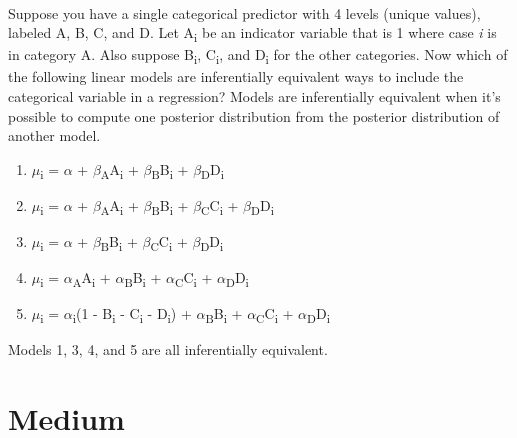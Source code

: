 \documentclass[12pt]{article}\usepackage[]{graphicx}\usepackage[]{color}
\newenvironment{problem}[2][Problem]{\begin{trivlist}
\item[\hskip \labelsep {\bfseries #1}\hskip \labelsep {\bfseries #2.}]}{\end{trivlist}}
\begin{document}
\begin{problem}{5E4}
\text{ }\\
Suppose you have a single categorical predictor with 4 levels (unique values), labeled A, B, C, and D. Let A\textsubscript{i} be an indicator variable that is 1 where case \textit{i} is in category A. Also suppose B\textsubscript{i}, C\textsubscript{i}, and D\textsubscript{i} for the other categories. Now which of the following linear models are inferentially equivalent ways to include the categorical variable in a regression? Models are inferentially equivalent when it's possible to compute one posterior distribution from the posterior distribution of another model.
\begin{enumerate}
	\item $\mu$\textsubscript{i} = $\alpha$ + $\beta$\textsubscript{A}A\textsubscript{i} + $\beta$\textsubscript{B}B\textsubscript{i} + $\beta$\textsubscript{D}D\textsubscript{i}
	\item $\mu$\textsubscript{i} = $\alpha$ + $\beta$\textsubscript{A}A\textsubscript{i} + $\beta$\textsubscript{B}B\textsubscript{i} + $\beta$\textsubscript{C}C\textsubscript{i} + $\beta$\textsubscript{D}D\textsubscript{i}
	\item $\mu$\textsubscript{i} = $\alpha$ + $\beta$\textsubscript{B}B\textsubscript{i} + $\beta$\textsubscript{C}C\textsubscript{i} + $\beta$\textsubscript{D}D\textsubscript{i}
	\item $\mu$\textsubscript{i} = $\alpha$\textsubscript{A}A\textsubscript{i} + $\alpha$\textsubscript{B}B\textsubscript{i} + $\alpha$\textsubscript{C}C\textsubscript{i} + $\alpha$\textsubscript{D}D\textsubscript{i}
	\item $\mu$\textsubscript{i} = $\alpha$\textsubscript{i}(1 - B\textsubscript{i} - C\textsubscript{i} - D\textsubscript{i}) + $\alpha$\textsubscript{B}B\textsubscript{i} + $\alpha$\textsubscript{C}C\textsubscript{i} + $\alpha$\textsubscript{D}D\textsubscript{i}
\end{enumerate}
\end{problem}

Models 1, 3, 4, and 5 are all inferentially equivalent.

\section{Medium}
\end{document}
